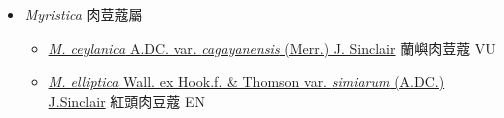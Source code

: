 
  \begin{itemize}
 \item[] \textit{Myristica} 肉荳蔻屬
                                
  \begin{itemize}
        \item[] \href{http://www.theplantlist.org/tpl1.1/search?q=Myristica+ceylanica+var.+cagayanensis}{\textit{M. ceylanica} A.DC. var. \textit{cagayanensis} (Merr.) J. Sinclair}   蘭嶼肉荳蔻   VU
        \item[] \href{http://www.theplantlist.org/tpl1.1/search?q=Myristica+elliptica+var.+simiarum}{\textit{M. elliptica} Wall. ex Hook.f. \& Thomson var. \textit{simiarum} (A.DC.) J.Sinclair}   紅頭肉豆蔻   EN
  \end{itemize}
  \end{itemize}
